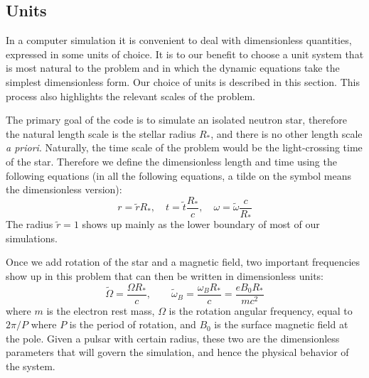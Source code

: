 \subsection{Units}
\label{sec:pic-units}

In a computer simulation it is convenient to deal with dimensionless quantities,
expressed in some units of choice. It is to our benefit to choose a unit system
that is most natural to the problem and in which the dynamic equations take the
simplest dimensionless form. Our choice of units is described in this section.
This process also highlights the relevant scales of the problem.

The primary goal of the code is to simulate an isolated neutron star, therefore
the natural length scale is the stellar radius $R_{*}$, and there is no other length
scale {\it a priori}. Naturally, the time scale of the problem would be the
light-crossing time of the star. Therefore we define the dimensionless length
and time using the following equations (in all the following equations, a tilde
on the symbol means the dimensionless version):
\begin{equation}
  r = \tilde{r}R_{*},\quad t = \tilde{t}\frac{R_{*}}{c},\quad \omega = \tilde{\omega}\frac{c}{R_{*}}
\end{equation}
The radius $\tilde{r} = 1$ shows up mainly as the lower boundary of most of our
simulations.

Once we add rotation of the star and a magnetic field, two important frequencies
show up in this problem that can then be written in dimensionless units:
\begin{equation}
  \tilde{\Omega} = \frac{\Omega R_{*}}{c},\qquad \tilde{\omega}_B = \frac{\omega_BR_{*}}{c} = \frac{e B_0R_{*}}{mc^2}
\end{equation}
where $m$ is the electron rest mass, $\Omega$ is the rotation angular frequency,
equal to $2\pi / P$ where $P$ is the period of rotation, and $B_0$ is the
surface magnetic field at the pole. Given a pulsar with certain radius, these
two are the dimensionless parameters that will govern the simulation, and hence
the physical behavior of the system.

